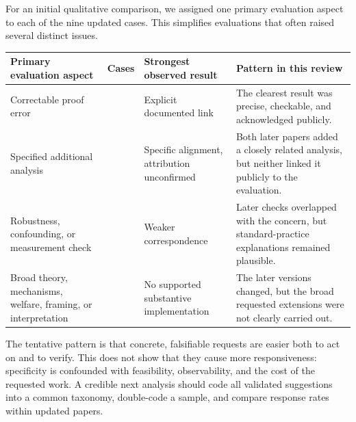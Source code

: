 \documentclass[
  11pt,
  letterpaper,
]{article}
\begin{document}
For an initial qualitative comparison, we assigned one primary
evaluation aspect to each of the nine updated cases. This simplifies
evaluations that often raised several distinct issues.

\begin{longtable}[]{@{}
  >{\raggedright\arraybackslash}p{}
  >{\raggedleft\arraybackslash}p{}
  >{\raggedright\arraybackslash}p{}
  >{\raggedright\arraybackslash}p{}@{}}
\toprule\noalign{}
\begin{minipage}[b]{\linewidth}\raggedright
Primary evaluation aspect
\end{minipage} & \begin{minipage}[b]{\linewidth}\raggedleft
Cases
\end{minipage} & \begin{minipage}[b]{\linewidth}\raggedright
Strongest observed result
\end{minipage} & \begin{minipage}[b]{\linewidth}\raggedright
Pattern in this review
\end{minipage} \\
\midrule\noalign{}
\endhead
\bottomrule\noalign{}
\endlastfoot
Correctable proof error & 1 & Explicit documented link & The clearest
result was precise, checkable, and acknowledged publicly. \\
Specified additional analysis & 2 & Specific alignment, attribution
unconfirmed & Both later papers added a closely related analysis, but
neither linked it publicly to the evaluation. \\
Robustness, confounding, or measurement check & 3 & Weaker
correspondence & Later checks overlapped with the concern, but
standard-practice explanations remained plausible. \\
Broad theory, mechanisms, welfare, framing, or interpretation & 3 & No
supported substantive implementation & The later versions changed, but
the broad requested extensions were not clearly carried out. \\
\end{longtable}

The tentative pattern is that concrete, falsifiable requests are easier
both to act on and to verify. This does not show that they cause more
responsiveness: specificity is confounded with feasibility,
observability, and the cost of the requested work. A credible next
analysis should code all validated suggestions into a common taxonomy,
double-code a sample, and compare response rates within updated papers.
\end{document}
